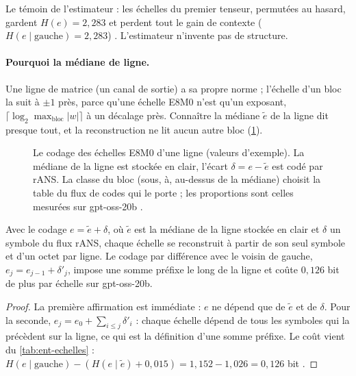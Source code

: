 Le témoin de l'estimateur : les échelles du premier tenseur, permutées au hasard, gardent $H(e) = 2{,}283$ et perdent tout le gain de contexte ($H(e \mid \text{gauche}) = 2{,}283$) \mes. L'estimateur n'invente pas de structure.

\paragraph{Pourquoi la médiane de ligne.} Une ligne de matrice (un canal de sortie) a sa propre norme ; l'échelle d'un bloc la suit à $\pm1$ près, parce qu'une échelle E8M0 n'est qu'un exposant, $\lceil \log_2 \max_{\text{bloc}} |w| \rceil$ à un décalage près. Connaître la médiane $\tilde e$ de la ligne dit presque tout, et la reconstruction ne lit aucun autre bloc (\cref{fig:ent-echelles-ligne}).

\begin{figure}[ht]
\centering
\resizebox{\linewidth}{!}{\SchemaEchellesLigne}
\caption[Le codage des échelles par la médiane de ligne]{Le codage des échelles E8M0 d'une ligne (valeurs d'exemple). La médiane de la ligne est stockée en clair, l'écart $\delta = e - \tilde e$ est codé par rANS. La classe du bloc (sous, à, au-dessus de la médiane) choisit la table du flux de codes qui le porte ; les proportions sont celles mesurées sur gpt-oss-20b \mes.}
\label{fig:ent-echelles-ligne}
\end{figure}

\begin{proposition}\label{prop:ent-locale}
Avec le codage $e = \tilde e + \delta$, où $\tilde e$ est la médiane de la ligne stockée en clair et $\delta$ un symbole du flux rANS, chaque échelle se reconstruit à partir de son seul symbole et d'un octet par ligne. Le codage par différence avec le voisin de gauche, $e_j = e_{j-1} + \delta'_j$, impose une somme préfixe le long de la ligne et coûte $0{,}126$ bit de plus par échelle sur gpt-oss-20b.
\end{proposition}

\begin{proof}
La première affirmation est immédiate : $e$ ne dépend que de $\tilde e$ et de $\delta$. Pour la seconde, $e_j = e_0 + \sum_{i \le j} \delta'_i$ : chaque échelle dépend de tous les symboles qui la précèdent sur la ligne, ce qui est la définition d'une somme préfixe. Le coût vient du \cref{tab:ent-echelles} : $H(e \mid \text{gauche}) - (H(e \mid \tilde e) + 0{,}015) = 1{,}152 - 1{,}026 = 0{,}126$ bit \calc.
\end{proof}

